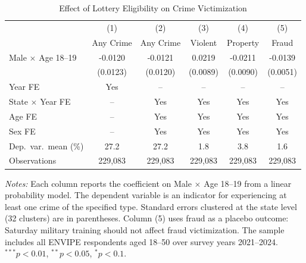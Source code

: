 \begin{table}[t]\begin{threeparttable}
\centering
\caption{Effect of Lottery Eligibility on Crime Victimization}
\label{tab:main}
\begin{tabular}{lccccc}
\hline\hline
 & (1) & (2) & (3) & (4) & (5) \\
 & Any Crime & Any Crime & Violent & Property & Fraud \\
\hline
\addlinespace
Male $\times$ Age 18--19 & -0.0120 & -0.0121 & 0.0219 & -0.0211 & -0.0139 \\
 & (0.0123) & (0.0120) & (0.0089) & (0.0090) & (0.0051) \\
\addlinespace
Year FE & Yes & -- & -- & -- & -- \\
State $\times$ Year FE & -- & Yes & Yes & Yes & Yes \\
Age FE & -- & Yes & Yes & Yes & Yes \\
Sex FE & -- & Yes & Yes & Yes & Yes \\
\addlinespace
Dep.~var.~mean (\%) & 27.2 & 27.2 & 1.8 & 3.8 & 1.6 \\
Observations & 229,083 & 229,083 & 229,083 & 229,083 & 229,083 \\
\hline\hline
\end{tabular}
\vspace{0.5em}\begin{tablenotes}[flushleft]
\small
\item \textit{Notes:} Each column reports the coefficient on Male $\times$ Age 18--19 from a linear probability model. The dependent variable is an indicator for experiencing at least one crime of the specified type. Standard errors clustered at the state level (32 clusters) are in parentheses. Column (5) uses fraud as a placebo outcome: Saturday military training should not affect fraud victimization. The sample includes all ENVIPE respondents aged 18--50 over survey years 2021--2024. $^{***}p<0.01$, $^{**}p<0.05$, $^{*}p<0.1$.
\end{tablenotes}
\end{threeparttable}\end{table}


